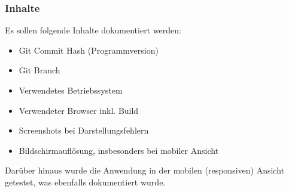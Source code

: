 \subsubsection*{Inhalte}
Es sollen folgende Inhalte dokumentiert werden:
\begin{itemize}
    \item Git Commit Hash (Programmversion)
    \item Git Branch
    \item Verwendetes Betriebssystem
    \item Verwendeter Browser inkl. Build
    \item Screenshots bei Darstellungsfehlern
    \item Bildschirmauflösung, insbesonders bei mobiler Ansicht
\end{itemize}
Darüber hinaus wurde die Anwendung in der mobilen (responsiven) Ansicht getestet, was ebenfalls dokumentiert wurde.

